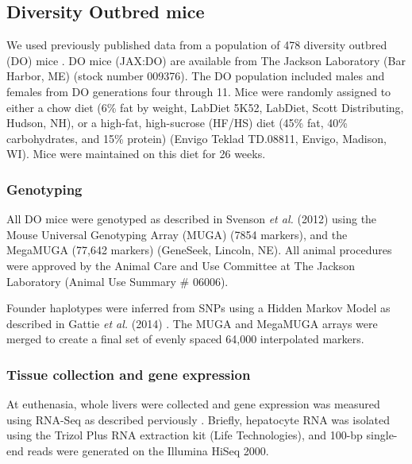 \documentclass[
  11pt,
]{article}
\begin{document}
\hypertarget{diversity-outbred-mice}{%
\subsection{Diversity Outbred mice}\label{diversity-outbred-mice}}

We used previously published data from a population of 478 diversity
outbred (DO) mice \citep{Svenson:2012hq}. DO mice (JAX:DO) are available
from The Jackson Laboratory (Bar Harbor, ME) (stock number 009376). The
DO population included males and females from DO generations four
through 11. Mice were randomly assigned to either a chow diet (6\% fat
by weight, LabDiet 5K52, LabDiet, Scott Distributing, Hudson, NH), or a
high-fat, high-sucrose (HF/HS) diet (45\% fat, 40\% carbohydrates, and
15\% protein) (Envigo Teklad TD.08811, Envigo, Madison, WI). Mice were
maintained on this diet for 26 weeks.

\hypertarget{genotyping}{%
\subsubsection{Genotyping}\label{genotyping}}

All DO mice were genotyped as described in Svenson \textit{et al.}
(2012) \citep{Svenson:2012hq} using the Mouse Universal Genotyping Array
(MUGA) (7854 markers), and the MegaMUGA (77,642 markers) (GeneSeek,
Lincoln, NE). All animal procedures were approved by the Animal Care and
Use Committee at The Jackson Laboratory (Animal Use Summary \# 06006).

Founder haplotypes were inferred from SNPs using a Hidden Markov Model
as described in Gattie \textit{et al.} (2014) \citep{Gatti:2014ko}. The
MUGA and MegaMUGA arrays were merged to create a final set of evenly
spaced 64,000 interpolated markers.

\hypertarget{tissue-collection-and-gene-expression}{%
\subsubsection{Tissue collection and gene
expression}\label{tissue-collection-and-gene-expression}}

At euthenasia, whole livers were collected and gene expression was
measured using RNA-Seq as described perviously
\citep{pmid27309819, pmid28592500}. Briefly, hepatocyte RNA was isolated
using the Trizol Plus RNA extraction kit (Life Technologies), and 100-bp
single-end reads were generated on the Illumina HiSeq 2000.
\end{document}
